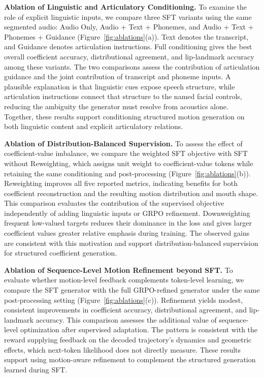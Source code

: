 \noindent\textbf{Ablation of Linguistic and Articulatory Conditioning.}
To examine the role of explicit linguistic inputs, we compare three SFT variants using the same segmented audio: Audio Only, Audio + Text + Phonemes, and Audio + Text + Phonemes + Guidance (Figure~\ref{fig:ablations}(a)). Text denotes the transcript, and Guidance denotes articulation instructions.
Full conditioning gives the best overall coefficient accuracy, distributional agreement, and lip-landmark accuracy among these variants.
The two comparisons assess the contribution of articulation guidance and the joint contribution of transcript and phoneme inputs.
A plausible explanation is that linguistic cues expose speech structure, while articulation instructions connect that structure to the named facial controls, reducing the ambiguity the generator must resolve from acoustics alone.
Together, these results support conditioning structured motion generation on both linguistic content and explicit articulatory relations.

\noindent\textbf{Ablation of Distribution-Balanced Supervision.}
To assess the effect of coefficient-value imbalance, we compare the weighted SFT objective with SFT without Reweighting, which assigns unit weight to coefficient-value tokens while retaining the same conditioning and post-processing (Figure~\ref{fig:ablations}(b)).
Reweighting improves all five reported metrics, indicating benefits for both coefficient reconstruction and the resulting motion distribution and mouth shape.
This comparison evaluates the contribution of the supervised objective independently of adding linguistic inputs or GRPO refinement.
Downweighting frequent low-valued targets reduces their dominance in the loss and gives larger coefficient values greater relative emphasis during training.
The observed gains are consistent with this motivation and support distribution-balanced supervision for structured coefficient generation.

\noindent\textbf{Ablation of Sequence-Level Motion Refinement beyond SFT.}
To evaluate whether motion-level feedback complements token-level learning, we compare the SFT generator with the full GRPO-refined generator under the same post-processing setting (Figure~\ref{fig:ablations}(c)).
Refinement yields modest, consistent improvements in coefficient accuracy, distributional agreement, and lip-landmark accuracy.
This comparison assesses the additional value of sequence-level optimization after supervised adaptation.
The pattern is consistent with the reward supplying feedback on the decoded trajectory's dynamics and geometric effects, which next-token likelihood does not directly measure.
These results support using motion-aware refinement to complement the structured generation learned during SFT.

